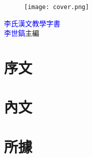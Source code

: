 \documentclass[a5paper,11pt]{book}
\begin{document}
\frontmatter
\doublespacing
\begin{wrapfigure}{r}{50mm}
\texttt{[image: cover.png]}
\end{wrapfigure}
\hfill
\vfill
{\Huge\textcolor{blue}{李氏漢文教學字書}}\\
{\textcolor{blue}{李世鎬}\hspace{14pt}主編}
\vspace{64pt}
\newpage
\addtolength{\topmargin}{20mm}
\mainmatter

\chapter*{序文}
\doublespacing


\chapter*{內文}
\begin{multicols}{3}
\doublespacing

\end{multicols}

\chapter*{所據}
\doublespacing

\end{document}
